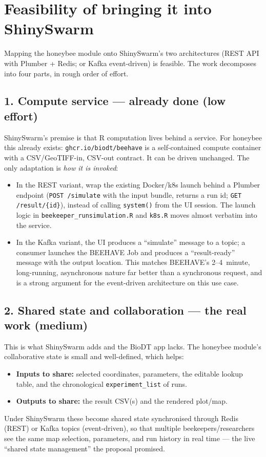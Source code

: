 \documentclass[12pt,a4paper]{article}
\begin{document}
\section{Feasibility of bringing it into ShinySwarm}

Mapping the honeybee module onto ShinySwarm's two architectures (REST API with
Plumber + Redis; or Kafka event-driven) is feasible. The work decomposes into
four parts, in rough order of effort.

\subsection{1. Compute service --- already done (low effort)}

ShinySwarm's premise is that R computation lives behind a service. For honeybee
this already exists: \texttt{ghcr.io/biodt/beehave} is a self-contained compute
container with a CSV/GeoTIFF-in, CSV-out contract. It can be driven unchanged.
The only adaptation is \emph{how it is invoked}:
\begin{itemize}[nosep]
  \item In the REST variant, wrap the existing Docker/k8s launch behind a Plumber
    endpoint (\texttt{POST /simulate} with the input bundle, returns a run id;
    \texttt{GET /result/\{id\}}), instead of calling \texttt{system()} from the
    UI session. The launch logic in \texttt{beekeeper\_runsimulation.R} and
    \texttt{k8s.R} moves almost verbatim into the service.
  \item In the Kafka variant, the UI produces a ``simulate'' message to a topic;
    a consumer launches the BEEHAVE Job and produces a ``result-ready'' message
    with the output location. This matches BEEHAVE's 2--4~minute, long-running,
    asynchronous nature far better than a synchronous request, and is a strong
    argument for the event-driven architecture on this use case.
\end{itemize}

\subsection{2. Shared state and collaboration --- the real work (medium)}

This is what ShinySwarm adds and the BioDT app lacks. The honeybee module's
collaborative state is small and well-defined, which helps:
\begin{itemize}[nosep]
  \item \textbf{Inputs to share:} selected coordinates, parameters, the editable
    lookup table, and the chronological \texttt{experiment\_list} of runs.
  \item \textbf{Outputs to share:} the result CSV(s) and the rendered plot/map.
\end{itemize}
Under ShinySwarm these become shared state synchronised through Redis (REST) or
Kafka topics (event-driven), so that multiple beekeepers/researchers see the same
map selection, parameters, and run history in real time --- the live ``shared
state management'' the proposal promised.
\end{document}
